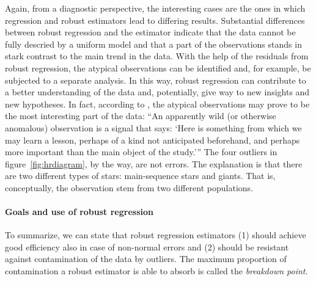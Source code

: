 Again, from a diagnostic perspective, the interesting cases are the ones in
which  regression and robust estimators lead to differing results.
Substantial differences between robust regression and the  estimator
indicate that the data cannot be fully descried by a uniform model and that a
part of the observations stands in stark contrast to the main trend in the
data. With the help of the residuals from robust regression, the atypical
observations can be identified and, for example, be subjected to a separate
analysis. In this way, robust regression can contribute to a better
understanding of the data and, potentially, give way to new insights and new
hypotheses. In fact, according to \citet[1]{kruskal60}, the atypical
observations may prove to be the most interesting part of the data: “An
apparently wild (or otherwise anomalous) observation is a signal that says:
`Here is something from which we may learn a lesson, perhaps of a kind not
anticipated beforehand, and perhaps more important than the main object of the
study.'” The four outliers in figure~\ref{fig:hrdiagram}, by the way, are not
errors. The explanation is that there are two different types of stars:
main-sequence stars and giants. That is, conceptually, the observation stem
from two different populations.

\paragraph{Goals and use of robust regression}

To summarize, we can state that robust regression estimators (1) should achieve
good efficiency also in case of non-normal errors and (2) should be resistant
against contamination of the data by outliers. The maximum proportion of
contamination a robust estimator is able to absorb is called the
\emph{breakdown point}.

